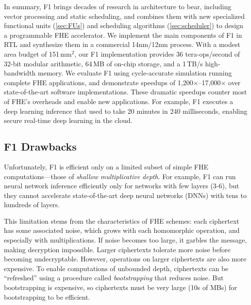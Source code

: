 In summary, F1 brings decades of research in architecture to bear, including vector processing and static scheduling, and combines them with new specialized functional units (\autoref{sec:FUs}) and scheduling algorithms (\autoref{sec:scheduler}) to design a programmable FHE accelerator.
We implement the main components of F1 in RTL and synthesize them in a commercial 14nm/12nm process.
With a modest area budget of 151\,mm$^2$, our F1 implementation 
provides 36 tera-ops/second of 32-bit modular arithmetic, 64\,MB of on-chip storage, and a 1\,TB/s high-bandwidth memory.
We evaluate F1 using cycle-accurate simulation running complete FHE applications,
and demonstrate speedups of 1,200$\times$--17,000$\times$ over state-of-the-art software implementations.
These dramatic speedups counter most of FHE's overheads and enable new applications.
For example, F1 executes a deep learning inference that used to take 20 minutes in 240 milliseconds,
enabling secure real-time deep learning in the cloud.

\subsection{F1 Drawbacks}

Unfortunately, F1 is efficient only on a limited subset of simple FHE
computations---those of \emph{shallow multiplicative depth}.
For example, F1 can run neural network inference efficiently only for networks with few layers (3-6),
but they cannot accelerate state-of-the-art deep neural networks (DNNs) with tens to hundreds of layers.

This limitation stems from the characteristics of FHE schemes:
each ciphertext has some associated noise, which grows with each homomorphic operation, and especially with multiplications.
If noise becomes too large, it garbles the message, making decryption impossible. 
Larger ciphertexts tolerate more noise before becoming undecryptable. 
However, operations on larger ciphertexts are also more expensive.
To enable computations of unbounded depth, ciphertexts can be ``refreshed'' using a procedure called \emph{bootstrapping}
that reduces noise. But bootstrapping is expensive, 
so ciphertexts must be very large (10s of MBs) for bootstrapping to be
efficient.

